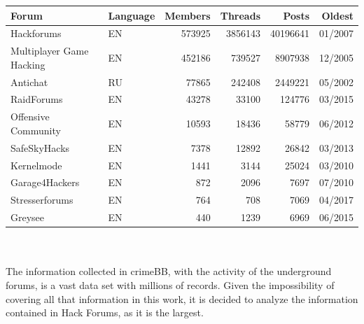 \vspace{0.5cm}

\begin{tabular}{llrrrr}
    \hline
    Forum & Language & Members & Threads & Posts & Oldest \\
    \hline
    Hackforums & EN & 573925 & 3856143 & 40196641 & 01/2007 \\
    Multiplayer Game Hacking & EN & 452186 & 739527 & 8907938 & 12/2005 \\
    Antichat & RU & 77865 & 242408 & 2449221 & 05/2002 \\
    RaidForums & EN & 43278 & 33100 & 124776 & 03/2015 \\
    Offensive Community & EN & 10593 & 18436 & 58779 & 06/2012 \\
    SafeSkyHacks & EN & 7378 & 12892 & 26842 & 03/2013 \\
    Kernelmode & EN & 1441 & 3144 & 25024 & 03/2010 \\
    Garage4Hackers & EN & 872 & 2096 & 7697 & 07/2010 \\
    Stresserforums & EN & 764 & 708 & 7069 & 04/2017 \\
    Greysee & EN & 440 & 1239 & 6969 & 06/2015 \\
    \hline
\end{tabular}
\\
\\
The information collected in crimeBB, with the activity of the underground forums, is a vast data set with millions of records. Given the impossibility of covering all that information in this work, it is decided to analyze the information contained in Hack Forums, as it is the largest.
